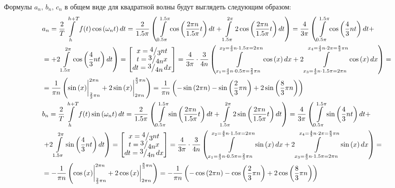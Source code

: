 \documentclass[a4paper, 16pt]{article}
\newcommand{\frc}[2]{\raisebox{2pt}{$#1$}\big/\raisebox{-3pt}{$#2$}}
\begin{document}
\noindent Формулы $a_n,\,b_n,\,c_n$ в общем виде для квадратной волны будут выглядеть следующим образом:
\begin{align*}
    & a_n=\dfrac{2}{T}\int\limits_{h}^{h+T}f(t)\cos{(\omega_n t)}\,dt=\dfrac{2}{1.5\pi}\left(\,\int\limits_{0.5\pi}^{1.5\pi}\cos{\left(\dfrac{2\pi n}{1.5\pi}t\right)}\,dt + \int\limits_{1.5\pi}^{2\pi}2\cos{\left(\dfrac{2\pi n}{1.5\pi}t\right)}\,dt\right)=\dfrac{4}{3\pi}\left(\,\int\limits_{0.5\pi}^{1.5\pi}\cos{\left(\dfrac{4}{3}nt\right)}\,dt+\right.\\
    & \left.=+2\int\limits_{1.5\pi}^{2\pi}\cos{\left(\dfrac{4}{3}nt\right)}\,dt\right)=
    \begin{bmatrix}
        x=\frc{4}{3}nt\\
        t=\frc{3}{4n}x\\
        dt=\frc{3}{4n}\,dx
    \end{bmatrix}
    =\dfrac{4}{3\pi}\cdot\dfrac{3}{4n}\left(\,\int\limits_{x_1=\frac{4}{3}n\cdot0.5\pi=\frac{2}{3}\pi n}^{x_2=\frac{4}{3}n\cdot1.5\pi=2\pi n}\cos{(x)}\,dx+2\int\limits_{x_3=\frac{4}{3}n\cdot1.5\pi=2\pi n}^{x_4=\frac{4}{3}n\cdot 2\pi=\frac{8}{3}\pi n}\cos{(x)}\,dx\right)=\\
    & =\dfrac{1}{\pi n}\left(\sin{(x)}\bigg|_{\frac{2}{3}\pi n}^{2\pi n}+2\sin{(x)}\bigg|_{2\pi n}^{\frac{8}{3}\pi n}\right)=\dfrac{1}{\pi n}\left(-\sin{(2\pi n)}-\sin{\left(\dfrac{2}{3}\pi n\right)}+2\sin{\left(\dfrac{8}{3}\pi n\right)}\right)\\
    & b_n=\dfrac{2}{T}\int\limits_{h}^{h+T}f(t)\sin{(\omega_n t)}\,dt=\dfrac{2}{1.5\pi}\left(\,\int\limits_{0.5\pi}^{1.5\pi}\sin{\left(\dfrac{2\pi n}{1.5\pi}t\right)}\,dt + \int\limits_{1.5\pi}^{2\pi}2\sin{\left(\dfrac{2\pi n}{1.5\pi}t\right)}\,dt\right)=\dfrac{4}{3\pi}\left(\,\int\limits_{0.5\pi}^{1.5\pi}\sin{\left(\dfrac{4}{3}nt\right)}\,dt+\right.\\
    & \left.+2\int\limits_{1.5\pi}^{2\pi}\sin{\left(\dfrac{4}{3}nt\right)}\,dt\right)=
    \begin{bmatrix}
        x=\frc{4}{3}nt\\
        t=\frc{3}{4n}x\\
        dt=\frc{3}{4n}\,dx
    \end{bmatrix}
    =\dfrac{4}{3\pi}\cdot\dfrac{3}{4n}\left(\,\int\limits_{x_1=\frac{4}{3}n\cdot0.5\pi=\frac{2}{3}\pi n}^{x_2=\frac{4}{3}n\cdot1.5\pi=2\pi n}\sin{(x)}\,dx+2\int\limits_{x_3=\frac{4}{3}n\cdot1.5\pi=2\pi n}^{x_4=\frac{4}{3}n\cdot 2\pi=\frac{8}{3}\pi n}\sin{(x)}\,dx\right)=\\
    & = -\dfrac{1}{\pi n}\left(\cos{(x)}\bigg|_{\frac{2}{3}\pi n}^{2\pi n}+2\cos{(x)}\bigg|_{2\pi n}^{\frac{8}{3}\pi n}\right)=-\dfrac{1}{\pi n}\left(-\cos{(2\pi n)}-\cos{\left(\dfrac{2}{3}\pi n\right)}+2\cos{\left(\dfrac{8}{3}\pi n\right)}\right)\\

\end{align*}
\end{document}
